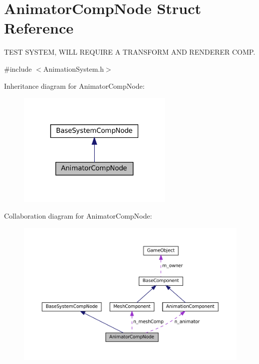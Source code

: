 \hypertarget{structAnimatorCompNode}{}\section{Animator\+Comp\+Node Struct Reference}
\label{structAnimatorCompNode}


T\+E\+ST S\+Y\+S\+T\+EM, W\+I\+LL R\+E\+Q\+U\+I\+RE A T\+R\+A\+N\+S\+F\+O\+RM A\+ND R\+E\+N\+D\+E\+R\+ER C\+O\+MP.  




{\ttfamily \#include $<$Animation\+System.\+h$>$}



Inheritance diagram for Animator\+Comp\+Node\+:
\nopagebreak
\begin{figure}[H]
\begin{center}
\leavevmode
\includegraphics[width=211pt]{structAnimatorCompNode__inherit__graph}
\end{center}
\end{figure}


Collaboration diagram for Animator\+Comp\+Node\+:
\nopagebreak
\begin{figure}[H]
\begin{center}
\leavevmode
\includegraphics[width=350pt]{structAnimatorCompNode__coll__graph}
\end{center}
\end{figure}
